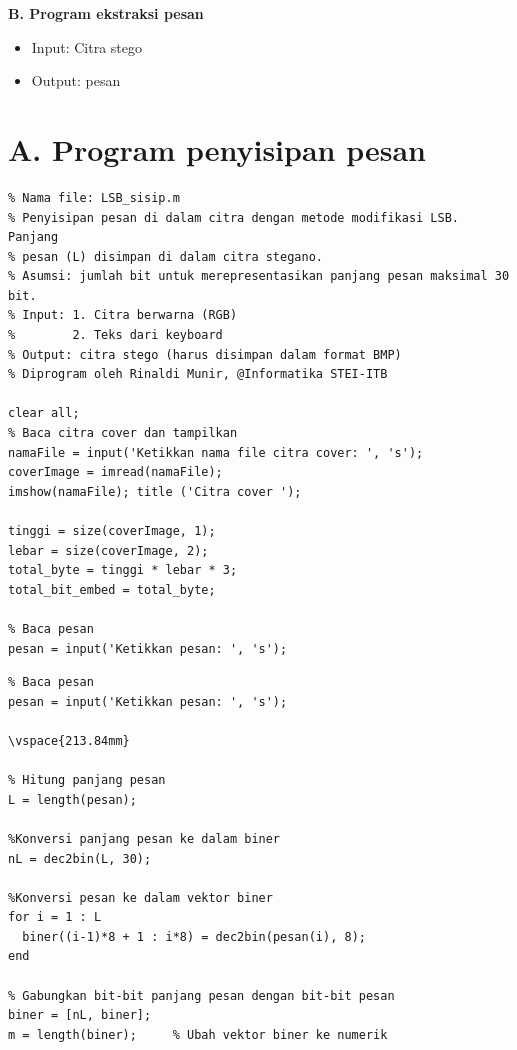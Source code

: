 \documentclass{article}
\begin{document}
{\textbf{B. Program ekstraksi pesan}
\begin{itemize}
    \item Input: Citra stego
    \item Output: pesan
\end{itemize}

\newpage


\section*{A. Program penyisipan pesan}

\begin{verbatim}
% Nama file: LSB_sisip.m
% Penyisipan pesan di dalam citra dengan metode modifikasi LSB. Panjang
% pesan (L) disimpan di dalam citra stegano.
% Asumsi: jumlah bit untuk merepresentasikan panjang pesan maksimal 30 bit.
% Input: 1. Citra berwarna (RGB)
%        2. Teks dari keyboard
% Output: citra stego (harus disimpan dalam format BMP)
% Diprogram oleh Rinaldi Munir, @Informatika STEI-ITB

clear all;
% Baca citra cover dan tampilkan
namaFile = input('Ketikkan nama file citra cover: ', 's');
coverImage = imread(namaFile);
imshow(namaFile); title ('Citra cover ');

tinggi = size(coverImage, 1);
lebar = size(coverImage, 2);
total_byte = tinggi * lebar * 3;
total_bit_embed = total_byte;

% Baca pesan
pesan = input('Ketikkan pesan: ', 's');
\end{verbatim}

\newpage


\begin{verbatim}
% Baca pesan
pesan = input('Ketikkan pesan: ', 's');

\vspace{213.84mm}

% Hitung panjang pesan
L = length(pesan);

%Konversi panjang pesan ke dalam biner
nL = dec2bin(L, 30);

%Konversi pesan ke dalam vektor biner
for i = 1 : L
  biner((i-1)*8 + 1 : i*8) = dec2bin(pesan(i), 8);
end

% Gabungkan bit-bit panjang pesan dengan bit-bit pesan
biner = [nL, biner];
m = length(biner);     % Ubah vektor biner ke numerik


\end{verbatim}}
\end{document}
